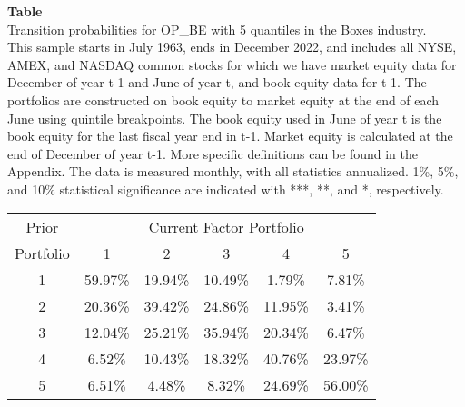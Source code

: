 \begin{table*}[ht!]
\raggedright
{}
\label{tab: transition_probs_OP_BE_Boxes_with_5_quantiles}
\textbf{Table \thetable} \\
Transition probabilities for OP_BE with 5 quantiles in the Boxes industry. \\
\hspace*{1em}This sample starts in July 1963, ends in December 2022, and includes all NYSE, AMEX, and NASDAQ common stocks for which we have market equity data for December of year t-1 and June of year t, and book equity data for t-1. The portfolios are constructed on book equity to market equity at the end of each June using quintile breakpoints.  The book equity used in June of year t is the book equity for the last fiscal year end in t-1.  Market equity is calculated at the end of December of year t-1.  More specific definitions can be found in the Appendix.  The data is measured monthly, with all statistics annualized.  1\%, 5\%, and 10\% statistical significance are indicated with ***, **, and *, respectively. \\
\vspace{0.5em}
\centering
\begin{adjustbox}{max width=\textwidth}
\begin{tabular}{@{}cccccc@{}}
\toprule
Prior & \multicolumn{5}{c}{Current Factor Portfolio} \\
Portfolio & 1 & 2 & 3 & 4 & 5 \\
\midrule
1 & 59.97\% & 19.94\% & 10.49\% & 1.79\% & 7.81\% \\
2 & 20.36\% & 39.42\% & 24.86\% & 11.95\% & 3.41\% \\
3 & 12.04\% & 25.21\% & 35.94\% & 20.34\% & 6.47\% \\
4 & 6.52\% & 10.43\% & 18.32\% & 40.76\% & 23.97\% \\
5 & 6.51\% & 4.48\% & 8.32\% & 24.69\% & 56.00\% \\
\bottomrule
\end{tabular}
\end{adjustbox}
\end{table*}